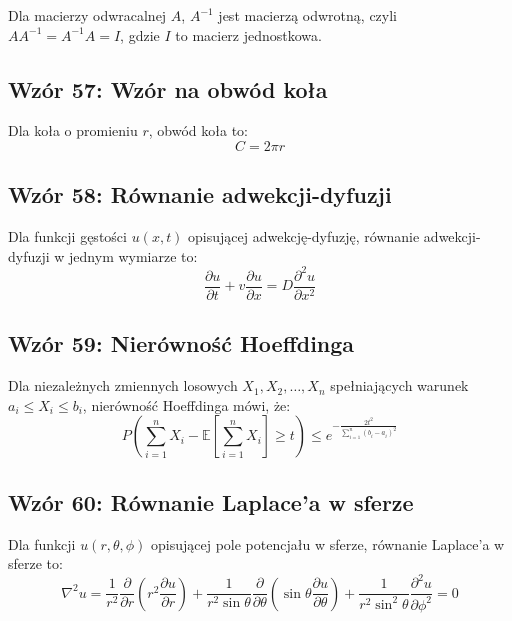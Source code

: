 \documentclass{article}
\begin{document}
Dla macierzy odwracalnej \(A\), \(A^{-1}\) jest macierzą odwrotną, czyli \(AA^{-1} = A^{-1}A = I\), gdzie \(I\) to macierz jednostkowa.

\subsection*{Wzór 57: Wzór na obwód koła}

Dla koła o promieniu \(r\), obwód koła to:
\[ C = 2\pi r \]

\subsection*{Wzór 58: Równanie adwekcji-dyfuzji}

Dla funkcji gęstości \(u(x, t)\) opisującej adwekcję-dyfuzję, równanie adwekcji-dyfuzji w jednym wymiarze to:
\[ \frac{\partial u}{\partial t} + v \frac{\partial u}{\partial x} = D \frac{\partial^2 u}{\partial x^2} \]

\subsection*{Wzór 59: Nierówność Hoeffdinga}

Dla niezależnych zmiennych losowych \(X_1, X_2, \ldots, X_n\) spełniających warunek \(a_i \leq X_i \leq b_i\), nierówność Hoeffdinga mówi, że:
\[ P\left(\sum_{i=1}^{n} X_i - \mathbb{E}\left[\sum_{i=1}^{n} X_i\right] \geq t\right) \leq e^{-\frac{2t^2}{\sum_{i=1}^{n} (b_i - a_i)^2}} \]

\subsection*{Wzór 60: Równanie Laplace'a w sferze}

Dla funkcji \(u(r, \theta, \phi)\) opisującej pole potencjału w sferze, równanie Laplace'a w sferze to:
\[ \nabla^2 u = \frac{1}{r^2}\frac{\partial}{\partial r}\left(r^2\frac{\partial u}{\partial r}\right) + \frac{1}{r^2\sin\theta}\frac{\partial}{\partial \theta}\left(\sin\theta\frac{\partial u}{\partial \theta}\right) + \frac{1}{r^2\sin^2\theta}\frac{\partial^2 u}{\partial \phi^2} = 0 \]
\end{document}

